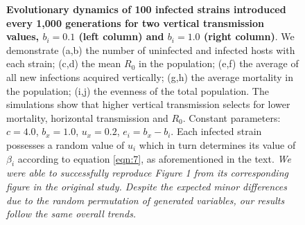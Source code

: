 \begin{figure}[tbph]
    \medskip
    \hfil
        
    \medskip
    \hfil
\caption{\textbf{Evolutionary dynamics of 100 infected strains introduced every 1,000 generations for two vertical transmission values, $b_i = 0.1$ (left column) and $b_i = 1.0$ (right column)}. We demonstrate (a,b) the number of uninfected and infected hosts with each strain; (c,d) the mean $R_0$ in the population; (e,f) the average of all new infections acquired vertically; (g,h) the average mortality in the population; (i,j) the evenness of the total population. The simulations show that higher vertical transmission selects for lower mortality, horizontal transmission and $R_0$. Constant parameters: $c = 4.0$, $b_x = 1.0$, $u_x = 0.2$, $e_i = b_x - b_i$. Each infected strain possesses a random value of $u_i$ \in [$u_x$, 1] which in turn determines its value of $\beta_i$ according to equation \ref{eqn:7}, as aforementioned in the text. \textit{We were able to successfully reproduce Figure 1 from its corresponding figure in the original study. Despite the expected minor differences due to the random permutation of generated variables, our results follow the same overall trends.}
}
    \label{fig:figure1}
\end{figure}

